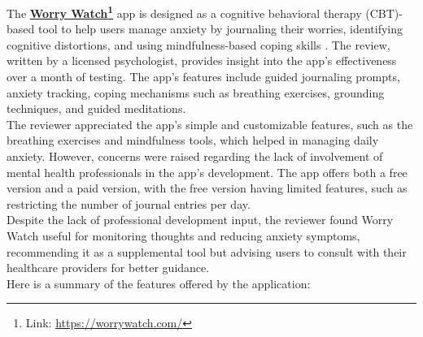 The \textbf{\href{https://worrywatch.com/}{Worry Watch}\footnote{Link: \url{https://worrywatch.com/}}} app is designed as a cognitive behavioral therapy (CBT)-based tool to help users manage anxiety by journaling their worries, identifying cognitive distortions, and using mindfulness-based coping skills \cite{worrywatch-review}. The review, written by a licensed psychologist, provides insight into the app's effectiveness over a month of testing. The app's features include guided journaling prompts, anxiety tracking, coping mechanisms such as breathing exercises, grounding techniques, and guided meditations.\vspace{5mm} \\
The reviewer appreciated the app's simple and customizable features, such as the breathing exercises and mindfulness tools, which helped in managing daily anxiety. However, concerns were raised regarding the lack of involvement of mental health professionals in the app's development. The app offers both a free version and a paid version, with the free version having limited features, such as restricting the number of journal entries per day.\vspace{5mm} \\
Despite the lack of professional development input, the reviewer found Worry Watch useful for monitoring thoughts and reducing anxiety symptoms, recommending it as a supplemental tool but advising users to consult with their healthcare providers for better guidance.\vspace{5mm} \\
Here is a summary of the features offered by the application:\vspace{5mm}

